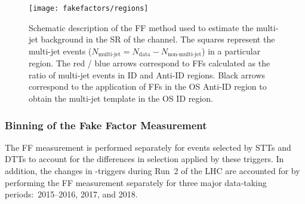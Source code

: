 \begin{figure}[htbp]
  \centering

  \texttt{[image: fakefactors/regions]}

  \caption[Schematic description of the FF method used to estimate the multi-jet
  background in the SR of the \hadhad channel.]{Schematic description of the FF
    method used to estimate the multi-jet background in the SR of the \hadhad
    channel. The squares represent the multi-jet events
    ($N_\text{multi-jet} = N_\text{data} - N_\text{non-multi-jet}$) in a
    particular region. The red / blue arrows correspond to FFs calculated as the
    ratio of multi-jet events in ID and Anti-ID regions. Black arrows correspond
    to the application of FFs in the OS Anti-ID region to obtain the multi-jet
    template in the OS ID region.}
  \label{fig:fakefactor_regions}
\end{figure}



\subsubsection{Binning of the Fake Factor Measurement}

The FF measurement is performed separately for events selected by STTs and DTTs
to account for the differences in selection applied by these triggers.
In addition, the changes in \tauhadvis-triggers during Run~2 of the LHC are
accounted for by performing the FF measurement separately for three major
data-taking periods:~2015--2016, 2017, and 2018.

%


